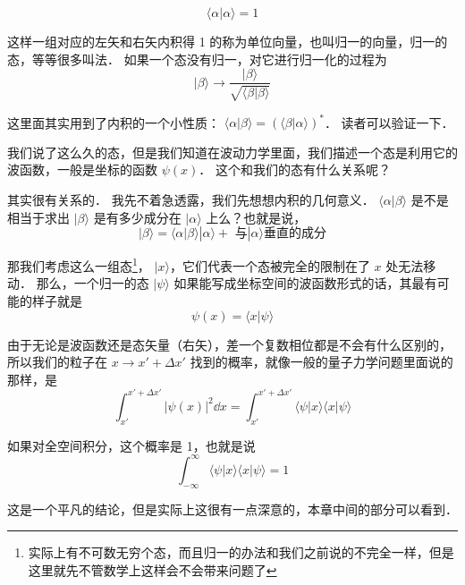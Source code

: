 \begin{example}{}
\begin{equation}
\langle\alpha|\alpha\rangle = 1
\end{equation}
\end{example}

这样一组对应的左矢和右矢内积得 1 的称为单位向量，也叫归一的向量，归一的态，等等很多叫法． 如果一个态没有归一，对它进行归一化的过程为
\begin{equation}
|\beta\rangle\rightarrow\frac{|\beta\rangle}{\sqrt{\langle\beta|\beta\rangle}}
\end{equation}

这里面其实用到了内积的一个小性质： $\langle\alpha|\beta\rangle = (\langle\beta|\alpha\rangle)^*$． 读者可以验证一下．

我们说了这么久的态，但是我们知道在波动力学里面，我们描述一个态是利用它的波函数，一般是坐标的函数 $\psi(x)$． 这个和我们的态有什么关系呢？

其实很有关系的． 我先不着急透露，我们先想想内积的几何意义． $\langle\alpha|\beta\rangle$ 是不是相当于求出 $|\beta\rangle$ 是有多少成分在 $|\alpha\rangle$ 上么？也就是说，
\begin{equation}
|\beta\rangle = \langle\alpha|\beta\rangle|\alpha\rangle + \text{ 与}|\alpha\rangle\text{垂直的成分} 
\end{equation}

那我们考虑这么一组态\footnote{实际上有不可数无穷个态，而且归一的办法和我们之前说的不完全一样，但是这里就先不管数学上这样会不会带来问题了}， $|x\rangle$，它们代表一个态被完全的限制在了 $x$ 处无法移动． 那么，一个归一的态 $|\psi\rangle$ 如果能写成坐标空间的波函数形式的话，其最有可能的样子就是
\begin{equation}
\psi(x) = \langle x|\psi\rangle
\end{equation}

由于无论是波函数还是态矢量（右矢），差一个复数相位都是不会有什么区别的，所以我们的粒子在 $x\rightarrow x'+\Delta x'$ 找到的概率，就像一般的量子力学问题里面说的那样，是
\begin{equation}
\int_{x'}^{x'+\Delta x'}|\psi(x)|^2 \dd{x} = \int_{x'}^{x'+\Delta x'} \langle\psi|x\rangle\langle x|\psi\rangle
\end{equation}

如果对全空间积分，这个概率是 1，也就是说
\begin{equation}
\int_{-\infty}^{\infty}\langle\psi|x\rangle\langle x|\psi\rangle = 1
\end{equation}

这是一个平凡的结论，但是实际上这很有一点深意的，本章中间的部分可以看到．

